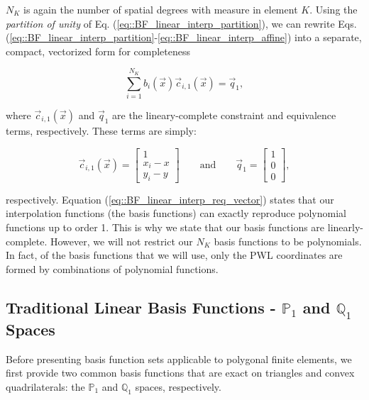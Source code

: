 \noindent $N_K$ is again the number of spatial degrees with measure in element $K$. Using the {\em partition of unity} of Eq. (\ref{eq::BF_linear_interp_partition}), we can rewrite Eqs. (\ref{eq::BF_linear_interp_partition}-\ref{eq::BF_linear_interp_affine}) into a separate, compact, vectorized form for completeness

\begin{equation}
\sum_{i=1}^{N_K}  b_i (\vec{x}) \vec{c}_{i,1}(\vec{x}) = \vec{q}_1 ,
\label{eq::BF_linear_interp_req_vector}
\end{equation}

\noindent where $\vec{c}_{i,1}(\vec{x})$ and $\vec{q}_1$ are the lineary-complete constraint and equivalence terms, respectively. These terms are simply:

\begin{equation}
\vec{c}_{i,1}(\vec{x}) = \left[
\begin{array}{c}
1 \\
x_i - x \\
y_i - y
\end{array} \right]
  \qquad \text{and} \qquad \vec{q}_1 = \left[
\begin{array}{c}
1 \\
0 \\
0
\end{array} \right],
\label{eq::BF_linear_constraint_terms}
\end{equation}

\noindent respectively. Equation (\ref{eq::BF_linear_interp_req_vector}) states that our interpolation functions (the basis functions) can exactly reproduce polynomial functions up to order 1. This is why we state that our basis functions are linearly-complete. However, we will not restrict our $N_K$ basis functions to be polynomials. In fact, of the basis functions that we will use, only the PWL coordinates are formed by combinations of polynomial functions.

\subsection{Traditional Linear Basis Functions - $\mathbb{P}_{1}$ and $\mathbb{Q}_{1}$ Spaces}
\label{sec::BF_2DLinear_LDandBLD}

Before presenting basis function sets applicable to polygonal finite elements, we first provide two common basis functions that are exact on triangles and convex quadrilaterals: the $\mathbb{P}_{1}$ and $\mathbb{Q}_{1}$ spaces, respectively. 

